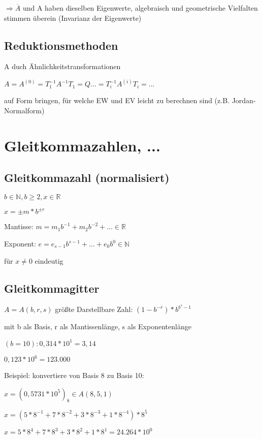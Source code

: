 \documentclass[12pt,a4paper]{article} %
\newcommand*\conj[1]{\overline{#1}}
\begin{document}
	$\Rightarrow \conj{A}$ und A haben dieselben Eigenwerte, algebraisch und geometrische Vielfalten stimmen überein (Invarianz der Eigenwerte)
	
	\subsection{Reduktionsmethoden}
	
	A duch Ähnlichkeitstransformationen 
	
	$A = A^{(0)} = T_1^{-1} A^{-1}T_1 = Q ... = T_i^{-1}A^{(i)}T_i = ...$
	
	auf Form bringen, für welche EW und EV leicht zu berechnen sind (z.B. Jordan-Normalform)
	
	\newpage
	
	\section{Gleitkommazahlen, ...}
	
	\subsection{Gleitkommazahl (normalisiert)}
	
	$b \in \mathbb{N}, b \ge 2, x \in \mathbb{R}$
	
	$x = \pm m * b^{\pm e}$
	
	Mantisse: $m = m_1b^{-1} + m_2b^{-2} + ... \in \mathbb{R}$
	
	Exponent: $e = e_{s-1}b^{s-1} + ... + e_0b^0 \in \mathbb{N}$
	
	für $x \ne 0$ eindeutig
	
	\subsection{Gleitkommagitter}
	
	$A = A(b, r, s)$ größte Darstellbare Zahl: $(1 - b^{-r})*b^{b^s-1}$
	
	mit b als Basis, r als Mantissenlänge, s als Exponentenlänge
	
	$(b = 10): 0,314 * 10^1 = 3,14$
	
	$0,123 * 10^6 = 123.000$
	
	Beispiel: konvertiere von Basis 8 zu Basis 10:
	
	$x = (0,5731 * 10^5)_8 \in A(8, 5, 1)$
	
	$x = (5 * 8^{-1} + 7 * 8^{-2} + 3 * 8^{-3} + 1 * 8^{-4}) * 8^5$
	
	$x = 5 * 8^4 + 7 * 8^3 + 3 * 8^2 + 1 * 8^1 = 24.264 * 10^0$
	
\end{document}
